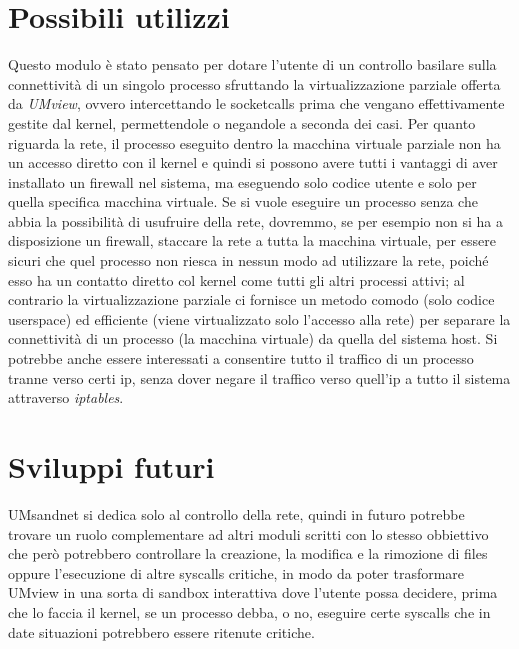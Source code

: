 \section{Possibili utilizzi}
Questo modulo è stato pensato per dotare l'utente di un controllo basilare sulla connettività di un singolo processo sfruttando la virtualizzazione parziale offerta da {\em UMview}, ovvero intercettando le socketcalls prima che vengano effettivamente gestite dal kernel, permettendole o negandole a seconda dei casi. Per quanto riguarda la rete, il processo eseguito dentro la macchina virtuale parziale non ha un accesso diretto con il kernel e quindi si possono avere tutti i vantaggi di aver installato un firewall nel sistema, ma eseguendo solo codice utente e solo per quella specifica macchina virtuale. Se si vuole eseguire un processo senza che abbia la possibilità di usufruire della rete, dovremmo, se per esempio non si ha a disposizione un firewall, staccare la rete a tutta la macchina virtuale, per essere sicuri che quel processo non riesca in nessun modo ad utilizzare la rete, poiché esso ha un contatto diretto col kernel come tutti gli altri processi attivi; al contrario la virtualizzazione parziale ci fornisce un metodo comodo (solo codice userspace) ed efficiente (viene virtualizzato solo l'accesso alla rete) per separare la connettività di un processo (la macchina virtuale) da quella del sistema host.
Si potrebbe anche essere interessati a consentire tutto il traffico di un processo tranne verso certi ip, senza dover negare il traffico verso quell'ip a tutto il sistema attraverso {\em iptables}.
\section{Sviluppi futuri}
UMsandnet si dedica solo al controllo della rete, quindi in futuro potrebbe trovare un ruolo complementare ad altri moduli scritti con lo stesso obbiettivo che però potrebbero controllare la creazione, la modifica e la rimozione di files oppure l'esecuzione di altre syscalls critiche, in modo da poter trasformare UMview in una sorta di sandbox interattiva dove l'utente possa decidere, prima che lo faccia il kernel, se un processo debba, o no, eseguire certe syscalls che in date situazioni potrebbero essere ritenute critiche.
